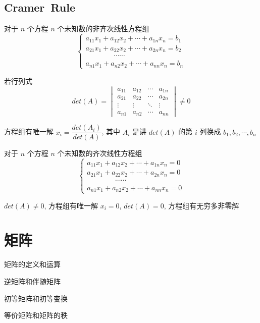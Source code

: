 \section{Cramer\ Rule}
\begin{theorem}
	对于 $n$ 个方程 $n$ 个未知数的非齐次线性方程组
	$$\begin{cases}
	  a_{11}x_{1} + a_{12}x_{2} + \cdots + a_{1n}x_{n} = b_{1}\\
	  a_{21}x_{1} + a_{22}x_{2} + \cdots + a_{2n}x_{n} = b_{2}\\
	  \qquad \qquad \cdots\cdots\\
	  a_{n1}x_{1} + a_{n2}x_{2} + \cdots + a_{nn}x_{n} = b_{n}
	\end{cases}$$

	若行列式 
	$$det(A) = \begin{vmatrix}
		a_{11} & a_{12} & \cdots & a_{1n}\\
		a_{21} & a_{22} & \cdots & a_{2n}\\
		\vdots & \vdots & \ddots & \vdots\\
		a_{n1} & a_{n2} & \cdots & a_{nn}
	\end{vmatrix}\neq 0$$

	方程组有唯一解 $x_{i} = \dfrac{det(A_{i})}{det(A)}$, 其中 $A_{i}$ 是讲 $det(A)$ 的第 $i$ 列换成 $b_{1}, b_{2}, \cdots, b_{n}$

	对于 $n$ 个方程 $n$ 个未知数的齐次线性方程组
	$$\begin{cases}
	  a_{11}x_{1} + a_{12}x_{2} + \cdots + a_{1n}x_{n} = 0\\
	  a_{21}x_{1} + a_{22}x_{2} + \cdots + a_{2n}x_{n} = 0\\
	  \qquad \qquad \cdots\cdots\\
	  a_{n1}x_{1} + a_{n2}x_{2} + \cdots + a_{nn}x_{n} = 0
	\end{cases}$$

	$det(A)\neq 0$, 方程组有唯一解 $x_{i} = 0$, $det(A) = 0$, 方程组有无穷多非零解

\end{theorem}


\chapter{矩阵}
\begin{introduction}
	\item 矩阵的定义和运算
	\item 逆矩阵和伴随矩阵
	\item 初等矩阵和初等变换
	\item 等价矩阵和矩阵的秩
\end{introduction}

